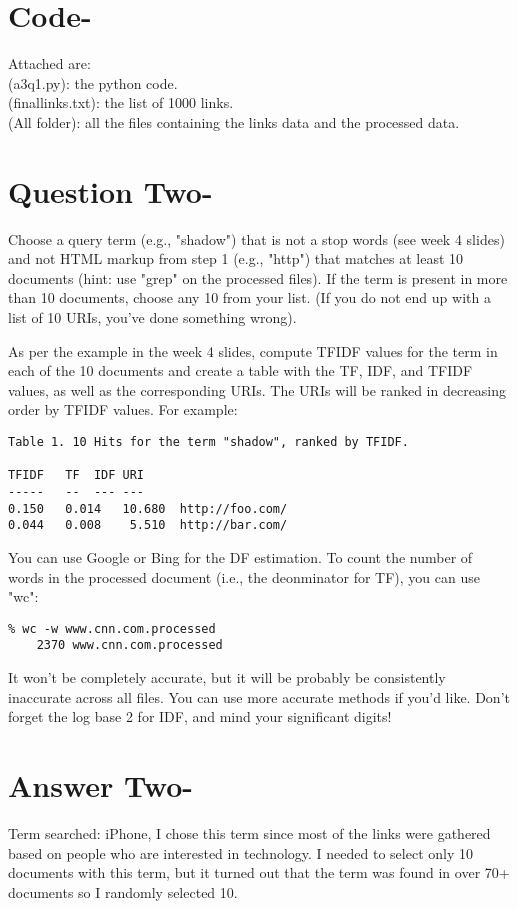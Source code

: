 \documentclass[letterpaper,11pt]{article}
\begin{document}
\section*{Code-}
Attached are:\\
(a3q1.py): the python code.\\
(finallinks.txt): the list of 1000 links.\\
(All folder): all the files containing the links data and the processed data.\\

\pagebreak


\section*{Question Two-}
Choose a query term (e.g., "shadow") that is not a stop words
(see week 4 slides) and not HTML markup from step 1 (e.g., "http")
that matches at least 10 documents (hint: use "grep" on the processed
files).  If the term is present in more than 10 documents, choose
any 10 from your list.  (If you do not end up with a list of 10
URIs, you've done something wrong).

As per the example in the week 4 slides, compute TFIDF values for
the term in each of the 10 documents and create a table with the
TF, IDF, and TFIDF values, as well as the corresponding URIs.  The
URIs will be ranked in decreasing order by TFIDF values.  For
example:

\begin{verbatim}
Table 1. 10 Hits for the term "shadow", ranked by TFIDF.

TFIDF	TF	IDF	URI
-----	--	---	---
0.150	0.014	10.680	http://foo.com/
0.044	0.008	 5.510	http://bar.com/
\end{verbatim}

You can use Google or Bing for the DF estimation.  To count the
number of words in the processed document (i.e., the deonminator
for TF), you can use "wc":
\begin{verbatim}
% wc -w www.cnn.com.processed
    2370 www.cnn.com.processed
\end{verbatim}
It won't be completely accurate, but it will be probably be
consistently inaccurate across all files.  You can use more 
accurate methods if you'd like.
Don't forget the log base 2 for IDF, and mind your significant
digits!
\pagebreak


\section*{Answer Two-}
Term searched: iPhone, I chose this term since most of the links were gathered based on people who are interested in  technology. I needed to select only 10 documents with this term, but it turned out that the term was found in over 70+ documents so I randomly selected 10.\\
\end{document}
